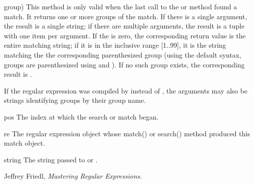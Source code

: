\begin{funcdesc}{group}{)}
This method is only valid when the last call to the 
or  method found a match.  It returns one or more
groups of the match.  If there is a single  argument,
the result is a single string; if there are multiple arguments, the
result is a tuple with one item per argument.  If the  is
zero, the corresponding return value is the entire matching string; if
it is in the inclusive range [1..99], it is the string matching the
the corresponding parenthesized group (using the default syntax,
groups are parenthesized using \code{\e (} and \code{\e )}).  If no
such group exists, the corresponding result is .

If the regular expression was compiled by  instead of
, the  arguments may also be strings
identifying groups by their group name.
\end{funcdesc}

\begin{datadesc}{pos}
The index at which the search or match began.
\end{datadesc}

\begin{datadesc}{re}
The regular expression object whose match() or search() method
produced this match object. 
\end{datadesc}

\begin{datadesc}{string}
The string passed to  or .
\end{datadesc}



\begin{seealso}
\seetext Jeffrey Friedl, \emph{Mastering Regular Expressions}.
\end{seealso}

